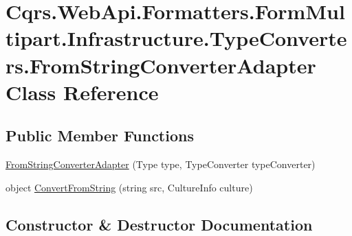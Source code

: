 \hypertarget{classCqrs_1_1WebApi_1_1Formatters_1_1FormMultipart_1_1Infrastructure_1_1TypeConverters_1_1FromStringConverterAdapter}{}\section{Cqrs.\+Web\+Api.\+Formatters.\+Form\+Multipart.\+Infrastructure.\+Type\+Converters.\+From\+String\+Converter\+Adapter Class Reference}
\label{classCqrs_1_1WebApi_1_1Formatters_1_1FormMultipart_1_1Infrastructure_1_1TypeConverters_1_1FromStringConverterAdapter}
\subsection*{Public Member Functions}
\begin{DoxyCompactItemize}
\item 
\hyperlink{classCqrs_1_1WebApi_1_1Formatters_1_1FormMultipart_1_1Infrastructure_1_1TypeConverters_1_1FromStringConverterAdapter_a8861572dad983012fbe36488b2b6913a_a8861572dad983012fbe36488b2b6913a}{From\+String\+Converter\+Adapter} (Type type, Type\+Converter type\+Converter)
\item 
object \hyperlink{classCqrs_1_1WebApi_1_1Formatters_1_1FormMultipart_1_1Infrastructure_1_1TypeConverters_1_1FromStringConverterAdapter_a3990570c78f6b10af60fa126113205c1_a3990570c78f6b10af60fa126113205c1}{Convert\+From\+String} (string src, Culture\+Info culture)
\end{DoxyCompactItemize}


\subsection{Constructor \& Destructor Documentation}
\mbox{\label{classCqrs_1_1WebApi_1_1Formatters_1_1FormMultipart_1_1Infrastructure_1_1TypeConverters_1_1FromStringConverterAdapter_a8861572dad983012fbe36488b2b6913a_a8861572dad983012fbe36488b2b6913a}} 
